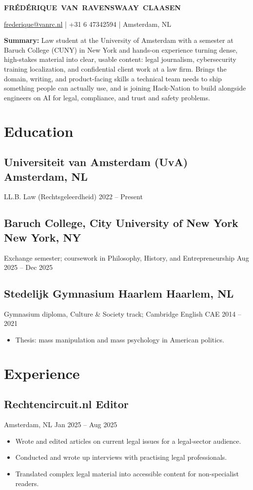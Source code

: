 \documentclass[10pt,letterpaper]{article}
\begin{document}
\begin{center}
    {\Large\bfseries FRÉDÉRIQUE~VAN~RAVENSWAAY~CLAASEN}
\end{center}
\vspace{2pt}
\begin{center}
\href{mailto:frederique@vanrc.nl}{frederique@vanrc.nl} \;|\;
+31 6 47342594 \;|\;
Amsterdam, NL
\end{center}
\vspace{0.1cm}
\textbf{Summary:} Law student at the University of Amsterdam with a semester at Baruch College (CUNY) in New York and hands-on experience turning dense, high-stakes material into clear, usable content: legal journalism, cybersecurity training localization, and confidential client work at a law firm. Brings the domain, writing, and product-facing skills a technical team needs to ship something people can actually use, and is joining Hack-Nation to build alongside engineers on AI for legal, compliance, and trust and safety problems.
\section{Education}
\subsection{Universiteit van Amsterdam (UvA) \hfill Amsterdam, NL}
LL.B. Law (Rechtsgeleerdheid) \hfill 2022 -- Present
\subsection{Baruch College, City University of New York \hfill New York, NY}
Exchange semester; coursework in Philosophy, History, and Entrepreneurship \hfill Aug 2025 -- Dec 2025
\subsection{Stedelijk Gymnasium Haarlem \hfill Haarlem, NL}
Gymnasium diploma, Culture \& Society track; Cambridge English CAE \hfill 2014 -- 2021
\begin{itemize}
\item Thesis: mass manipulation and mass psychology in American politics.
\end{itemize}
\section{Experience}
\subsection{Rechtencircuit.nl \hfill Editor}
Amsterdam, NL \hfill Jan 2025 -- Aug 2025
\begin{itemize}
\item Wrote and edited articles on current legal issues for a legal-sector audience.
\item Conducted and wrote up interviews with practising legal professionals.
\item Translated complex legal material into accessible content for non-specialist readers.
\end{itemize}
\end{document}

